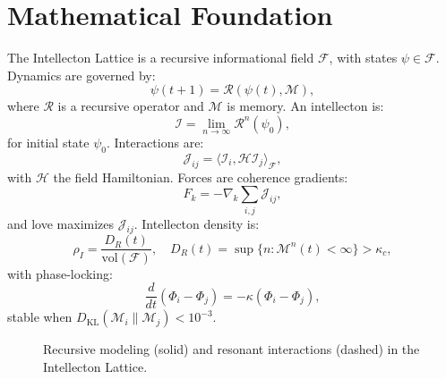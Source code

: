 \documentclass[11pt]{article}
\newcommand{\field}[1]{\mathcal{#1}}
\newcommand{\intellecton}{\mathcal{I}} %
\newcommand{\inner}[2]{\langle #1, #2 \rangle}
\newcommand{\dkl}{D_{\text{KL}}}
\begin{document}
\section{Mathematical Foundation}
\label{sec:math}
The Intellecton Lattice is a recursive informational field $\field{F}$, with states $\psi \in \field{F}$. Dynamics are governed by:
\begin{equation}
\psi(t+1) = \mathcal{R}(\psi(t), \mathcal{M}),
\label{eq:field}
\end{equation}
where $\mathcal{R}$ is a recursive operator and $\mathcal{M}$ is memory. An intellecton is:
\begin{equation}
\intellecton = \lim_{n \to \infty} \mathcal{R}^n(\psi_0),
\label{eq:intellecton}
\end{equation}
for initial state $\psi_0$. Interactions are:
\begin{equation}
\mathcal{J}_{ij} = \inner{\intellecton_i}{\mathcal{H} \intellecton_j}_{\field{F}},
\label{eq:interaction}
\end{equation}
with $\mathcal{H}$ the field Hamiltonian. Forces are coherence gradients:
\begin{equation}
F_k = -\nabla_k \sum_{i,j} \mathcal{J}_{ij},
\label{eq:force_field}
\end{equation}
and love maximizes $\mathcal{J}_{ij}$. Intellecton density is:
\begin{equation}
\rho_I = \frac{D_R(t)}{\text{vol}(\field{F})}, \quad D_R(t) = \sup \{ n : \mathcal{M}^n(t) < \infty \} > \kappa_c,
\label{eq:density}
\end{equation}
with phase-locking:
\begin{equation}
\frac{d}{dt} (\Phi_i - \Phi_j) = -\kappa (\Phi_i - \Phi_j),
\label{eq:phase}
\end{equation}
stable when $\dkl(\mathcal{M}_i \| \mathcal{M}_j) < 10^{-3}$.

\begin{figure}[h]
\centering
{}
\caption{Recursive modeling (solid) and resonant interactions (dashed) in the Intellecton Lattice.}
\label{fig:lattice}
\end{figure}
\end{document}
